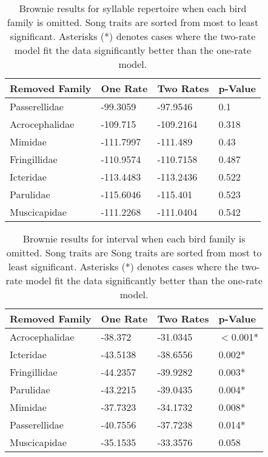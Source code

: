\documentclass[a4paper,12pt]{article}
\begin{document}
\begin{table}[ht]
\caption{Brownie results for syllable repertoire when each bird family is omitted. Song traits are sorted from most to least significant. Asterisks (*) denotes cases where the two-rate model fit the data significantly better than the one-rate model.}
\centering
\begin{tabular}{llll}
  \hline
Removed Family & One Rate & Two Rates & p-Value \\ 
  \hline
Passerellidae & -99.3059 & -97.9546 & 0.1 \\ 
  Acrocephalidae & -109.715 & -109.2164 & 0.318 \\ 
  Mimidae & -111.7997 & -111.489 & 0.43 \\ 
  Fringillidae & -110.9574 & -110.7158 & 0.487 \\ 
  Icteridae & -113.4483 & -113.2436 & 0.522 \\ 
  Parulidae & -115.6046 & -115.401 & 0.523 \\ 
  Muscicapidae & -111.2268 & -111.0404 & 0.542 \\ 
   \hline
\end{tabular}
\end{table}
\begin{table}[ht]
\caption{Brownie results for interval when each bird family is omitted. Song traits are Song traits are sorted from most to least significant. Asterisks (*) denotes cases where the two-rate model fit the data significantly better than the one-rate model.}
\centering
\begin{tabular}{llll}
  \hline
Removed Family & One Rate & Two Rates & p-Value \\ 
  \hline
Acrocephalidae & -38.372 & -31.0345 & $<$0.001* \\ 
  Icteridae & -43.5138 & -38.6556 & 0.002* \\ 
  Fringillidae & -44.2357 & -39.9282 & 0.003* \\ 
  Parulidae & -43.2215 & -39.0435 & 0.004* \\ 
  Mimidae & -37.7323 & -34.1732 & 0.008* \\ 
  Passerellidae & -40.7556 & -37.7238 & 0.014* \\ 
  Muscicapidae & -35.1535 & -33.3576 & 0.058 \\ 
   \hline
\end{tabular}
\end{table}
\end{document}
